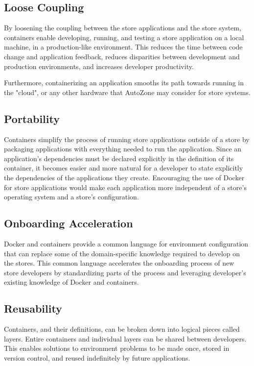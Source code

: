 \documentclass{article}
\begin{document}
\subsection{Loose Coupling}
By loosening the coupling between the store applications and the store system, containers enable developing, running, and testing a store application on a local machine, in a production-like environment. This reduces the time between code change and application feedback, reduces disparities between development and production environments, and increases developer productivity.

Furthermore, containerizing an application smooths its path towards running in the "cloud", or any other hardware that AutoZone may consider for store systems.

\subsection{Portability}
Containers simplify the process of running store applications outside of a store by packaging applications with everything needed to run the application. Since an application's dependencies must be declared explicitly in the definition of its container, it becomes easier and more natural for a developer to state explicitly the dependencies of the applications they create. Encouraging the use of Docker for store applications would make each application more independent of a store's operating system and a store's configuration.

\subsection{Onboarding Acceleration}
Docker and containers provide a common language for environment configuration that can replace some of the domain-specific knowledge required to develop on the stores. This common language accelerates the onboarding process of new store developers by standardizing parts of the process and leveraging developer's existing knowledge of Docker and containers.

\subsection{Reusability}
Containers, and their definitions, can be broken down into logical pieces called layers. Entire containers and individual layers can be shared between developers. This enables solutions to environment problems to be made once, stored in version control, and reused indefinitely by future applications.
\end{document}
